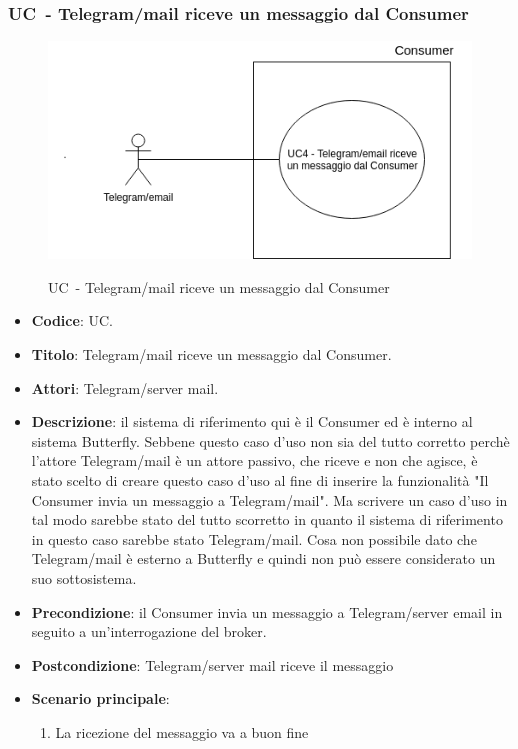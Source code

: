 \subsubsection{UC\theuccount\ - Telegram/mail riceve un messaggio dal Consumer}
	\begin{figure}[H]
		\centering
			\includegraphics[width=\columnwidth]{img/UC4.png}\\
		\caption{UC\theuccount\ - Telegram/mail riceve un messaggio dal Consumer}
	\end{figure}
	\begin{itemize}
		\item \textbf{Codice}: UC\theuccount.
		\item \textbf{Titolo}: Telegram/mail riceve un messaggio dal Consumer.
		\item \textbf{Attori}: Telegram/server mail.
		\item \textbf{Descrizione}: il sistema di riferimento qui è il Consumer ed è interno al sistema Butterfly.
		Sebbene questo caso d'uso non sia del tutto corretto perchè l'attore Telegram/mail è un attore passivo, che riceve e non che agisce, è stato scelto di creare questo caso d'uso al fine di inserire la funzionalità "Il Consumer invia un messaggio a Telegram/mail". Ma scrivere un caso d'uso in tal modo sarebbe stato del tutto scorretto in quanto il sistema di riferimento in questo caso sarebbe stato Telegram/mail. Cosa non possibile dato che Telegram/mail è esterno a Butterfly e quindi non può essere considerato un suo sottosistema.
		\item \textbf{Precondizione}: il Consumer invia un messaggio a Telegram/server email in seguito a un'interrogazione del broker.
		\item \textbf{Postcondizione}: Telegram/server mail riceve il messaggio
		\item \textbf{Scenario principale}:
		\begin{enumerate}
			\item La ricezione del messaggio va a buon fine
		\end{enumerate} 
	\end{itemize}

